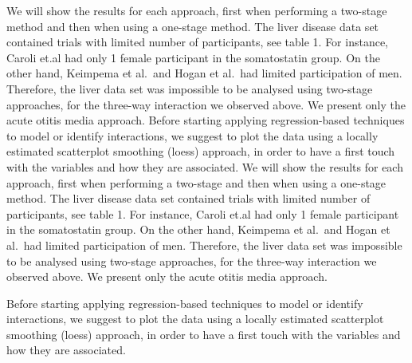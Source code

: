 \documentclass[14pt,]{article}
\begin{document}
We will show the results for each approach, first when performing a
two-stage method and then when using a one-stage method. The liver
disease data set contained trials with limited number of participants,
see table 1. For instance, Caroli et.al had only 1 female participant in
the somatostatin group. On the other hand, Keimpema et al.~and Hogan et
al.~had limited participation of men. Therefore, the liver data set was
impossible to be analysed using two-stage approaches, for the three-way
interaction we observed above. We present only the acute otitis media
approach. Before starting applying regression-based techniques to model
or identify interactions, we suggest to plot the data using a locally
estimated scatterplot smoothing (loess) approach, in order to have a
first touch with the variables and how they are associated. We will show
the results for each approach, first when performing a two-stage and
then when using a one-stage method. The liver disease data set contained
trials with limited number of participants, see table 1. For instance,
Caroli et.al had only 1 female participant in the somatostatin group. On
the other hand, Keimpema et al.~and Hogan et al.~had limited
participation of men. Therefore, the liver data set was impossible to be
analysed using two-stage approaches, for the three-way interaction we
observed above. We present only the acute otitis media approach.

Before starting applying regression-based techniques to model or
identify interactions, we suggest to plot the data using a locally
estimated scatterplot smoothing (loess) approach, in order to have a
first touch with the variables and how they are associated.
\end{document}
